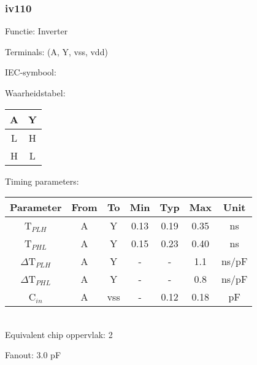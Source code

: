 \subsubsection{iv110}

Functie: Inverter

Terminals: (A, Y, vss, vdd)


IEC-symbool:
\begin{figure}[bth]
\end{figure}

\begin{minipage}[t]{0.3\textwidth}
Waarheidstabel:\\

\begin{tabular}{|c||c|}
\hline
A	&Y\\
\hline
L	&H\\
H	&L\\
\hline
\end{tabular}
\end{minipage}
\hfill
\begin{minipage}[t]{0.6\textwidth}
Timing parameters:\\

\begin{tabular}{|c|cc|ccc|c|}
\hline
Parameter		&From	&To	&Min	&Typ	&Max	&Unit\\
\hline
T$_{PLH}$               &A	&Y	&0.13	&0.19	&0.35	&ns\\
T$_{PHL}$               &A	&Y	&0.15	&0.23	&0.40	&ns\\
\hline
$\Delta$T$_{PLH}$       &A	&Y	&-	&-	&1.1	&ns/pF\\
$\Delta$T$_{PHL}$       &A	&Y	&-	&-	&0.8	&ns/pF\\
\hline
C$_{in}$                &A	&vss	&-	&0.12	&0.18	&pF\\
\hline
\end{tabular}
\end{minipage}
\\

Equivalent chip oppervlak: 2

Fanout: 3.0 pF


\clearpage
